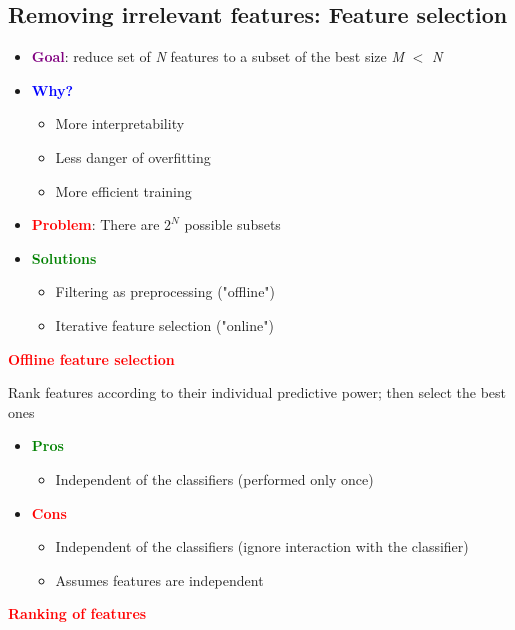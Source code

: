 \documentclass[11pt]{article}
\begin{document}
\subsection*{Removing irrelevant features: Feature selection}

\begin{itemize}
	\item \textcolor{purple}{\textbf{Goal}}: reduce set of \textit{N} features to a subset of the best size \textit{M} $<$ \textit{N}
	\item \textbf{\textcolor{blue}{Why?}}
		\begin{itemize}
			\item More interpretability
	\item Less danger of overfitting
	\item More efficient training
\end{itemize}
	\item \textbf{\textcolor{red}{Problem}}: There are $2^{N}$ possible subsets
	\item \textbf{\textcolor{green}{Solutions}}
		\begin{itemize}
			\item Filtering as preprocessing ("offline")
	\item Iterative feature selection ("online")
\end{itemize}
\end{itemize}

\textbf{\textcolor{red}{Offline feature selection}}

Rank features according to their individual predictive power; then select the best ones

\begin{itemize}
	\item \textbf{\textcolor{green}{Pros}}
		\begin{itemize}
			\item Independent of the classifiers (performed only once)
		\end{itemize}
	\item \textbf{\textcolor{red}{Cons}}
		\begin{itemize}
			\item Independent of the classifiers (ignore interaction with the classifier)
			\item Assumes features are independent
		\end{itemize}
\end{itemize}

\textbf{\textcolor{red}{Ranking of features}}
\end{document}
